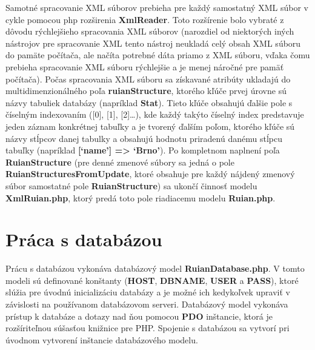 Samotné spracovanie XML súborov prebieha pre každý samostatný XML súbor v cykle pomocou php rozširenia {\bf XmlReader}. Toto rozšírenie bolo vybraté z dôvodu rýchlejšieho spracovania XML súborov (narozdiel od niektorých iných nástrojov pre spracovanie XML tento nástroj neukladá celý obsah XML súboru do pamäte počítača, ale načíta potrebné dáta priamo z XML súboru, vďaka čomu prebieha spracovanie XML súboru rýchlejšie a je menej náročné pre pamäť počítača). Počas spracovania XML súboru sa získavané atribúty ukladajú do multidimenzionálného poľa {\bf ruianStructure}, ktorého kľúče prvej úrovne sú názvy tabuliek databázy (napríklad {\bf Stat}). Tieto kľúče obsahujú ďalšie pole s číselným indexovaním ([0], [1], [2]…), kde každý takýto číselný index predstavuje jeden záznam konkrétnej tabuľky a je tvorený ďalším poľom, ktorého kľúče sú názvy stĺpcov danej tabulky a obsahujú hodnotu priradenú danému stĺpcu tabuľky (napríklad {\bf[‘name’] => ‘Brno’}). Po kompletnom naplnení poľa {\bf RuianStructure} (pre denné zmenové súbory sa jedná o pole {\bf RuianStructuresFromUpdate}, ktoré obsahuje pre každý nájdený zmenový súbor samostatné pole {\bf RuianStructure}) sa ukončí činnosť modelu {\bf XmlRuian.php}, ktorý predá toto pole riadiacemu modelu {\bf Ruian.php}.
\section{Práca s databázou}
Prácu s databázou vykonáva databázový model {\bf RuianDatabase.php}. V tomto modeli sú definované konštanty ({\bf HOST}, {\bf DBNAME}, {\bf USER} a {\bf PASS}), ktoré slúžia pre úvodnú inicializáciu databázy a je možné ich kedykoľvek upraviť v závislosti na používanom databázovom serveri. Databázový model vykonáva prístup k databáze a dotazy nad ňou pomocou {\bf PDO} inštancie, ktorá je rozšíriteľnou súšasťou knižnice pre PHP. Spojenie s databázou sa vytvorí pri úvodnom vytvorení inštancie databázového modelu.

